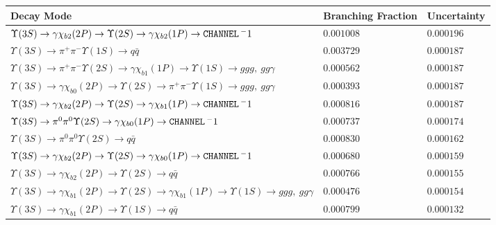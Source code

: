 \documentclass[12pt]{article}
\begin{document}
\newpage
\hspace{-1.3in} \vspace{-1.4in}
\begin{tabular}{p{4.7in} l l}
Decay Mode & Branching Fraction & Uncertainty \\ \hline
$   \Upsilon(3S) \to \gamma \chi_{b2}(2P) \to \Upsilon(2S) \to \gamma \chi_{b2}(1P) \to {\tt \small CHANNEL} \, ^-1                 $ & $   0.001008     $ & $   0.000196     $ \\ 
$   \Upsilon(3S) \to \pi^+ \pi^- \Upsilon(1S) \to q\bar{q}                                                               $ & $   0.003729     $ & $   0.000187    $ \\ 
$   \Upsilon(3S) \to \pi^+ \pi^- \Upsilon(2S) \to \gamma \chi_{b1}(1P) \to \Upsilon(1S) \to ggg,\ gg\gamma                $ & $   0.000562     $ & $   0.000187    $ \\ 
$   \Upsilon(3S) \to \gamma \chi_{b0}(2P) \to \Upsilon(2S) \to \pi^+ \pi^- \Upsilon(1S) \to ggg,\ gg\gamma                $ & $   0.000393    $ & $   0.000187    $ \\ 
$   \Upsilon(3S) \to \gamma \chi_{b2}(2P) \to \Upsilon(2S) \to \gamma \chi_{b1}(1P) \to {\tt \small CHANNEL} \, ^-1                 $ & $   0.000816     $ & $   0.000187     $ \\ 
$   \Upsilon(3S) \to \pi^0 \pi^0 \Upsilon(2S) \to \gamma \chi_{b0}(1P) \to {\tt \small CHANNEL} \, ^-1                              $ & $   0.000737                 $ & $   0.000174     $ \\ 
$   \Upsilon(3S) \to \pi^0 \pi^0 \Upsilon(2S) \to q\bar{q}                                                               $ & $   0.000830     $ & $   0.000162    $ \\ 
$   \Upsilon(3S) \to \gamma \chi_{b2}(2P) \to \Upsilon(2S) \to \gamma \chi_{b0}(1P) \to {\tt \small CHANNEL} \, ^-1                 $ & $   0.000680             $ & $   0.000159    $ \\ 
$   \Upsilon(3S) \to \gamma \chi_{b2}(2P) \to \Upsilon(2S) \to q\bar{q}                                                  $ & $   0.000766     $ & $   0.000155    $ \\ 
$   \Upsilon(3S) \to \gamma \chi_{b1}(2P) \to \Upsilon(2S) \to \gamma \chi_{b1}(1P) \to \Upsilon(1S) \to ggg,\ gg\gamma   $ & $   0.000476      $ & $   0.000154    $ \\ 
$   \Upsilon(3S) \to \gamma \chi_{b1}(2P) \to \Upsilon(1S) \to q\bar{q}                                                  $ & $   0.000799     $ & $   0.000132    $ \\ 

\end{tabular}
\end{document}
